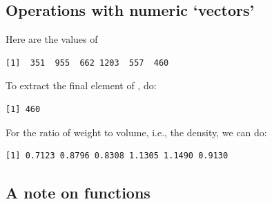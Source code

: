 \subsection*{Operations with numeric `vectors'}
Here are the values of 
\begin{knitrout}
\color{fgcolor}\begin{kframe}
\begin{alltt}
\end{alltt}
\begin{verbatim}
[1]  351  955  662 1203  557  460
\end{verbatim}
\end{kframe}
\end{knitrout}

To extract the final element of , do:
\begin{knitrout}
\color{fgcolor}\begin{kframe}
\begin{alltt}
\hlstd{volume[}\hlstd{]}
\end{alltt}
\begin{verbatim}
[1] 460
\end{verbatim}
\end{kframe}
\end{knitrout}
For the ratio of weight to volume, i.e., the density, we can do:
\begin{knitrout}
\color{fgcolor}\begin{kframe}
\begin{alltt}
\hlopt{/}
\end{alltt}
\begin{verbatim}
[1] 0.7123 0.8796 0.8308 1.1305 1.1490 0.9130
\end{verbatim}
\end{kframe}
\end{knitrout}

\subsection*{A note on functions}

